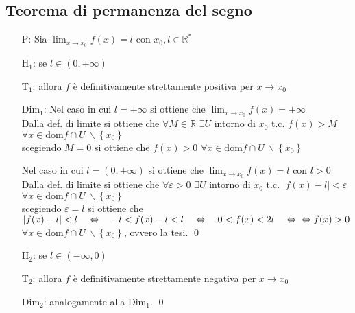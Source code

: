 \documentclass[a4paper]{article}
\newcommand\dom{\text{dom}}
\begin{document}
\subsection{Teorema di permanenza del segno}
\begin{itemize}
	\item[P: ] Sia \(\displaystyle \lim_{x \to x_0} f(x) = l\) con \(x_0, l \in \mathbb{R}^*\)
	\item[H\(_1\): ] se \(l \in \left( 0, + \infty \right)\)
	\item[T\(_1\): ] allora \(f\) è definitivamente strettamente positiva per \(x \to x_0\)
	\item[Dim\(_1\): ] Nel caso in cui \(l = + \infty\) si ottiene che \(\displaystyle \lim_{x \to x_0} f(x) = + \infty\) \\
	Dalla def. di limite si ottiene che \(\forall M \in \mathbb{R}\) \(\exists U\) intorno di \(x_0\) t.c. \(f(x) > M\) \(\forall x \in \dom f \cap U \  \backslash \left\{ x_0 \right\}\) \\
	scegiendo \(M = 0\) si ottiene che \(f(x) > 0\) \(\forall x \in \dom f \cap U \  \backslash \left\{ x_0 \right\}\)
	\item[] Nel caso in cui \(l = \left( 0, + \infty \right)\) si ottiene che \(\displaystyle \lim_{x \to x_0} f(x) = l\) con \(l > 0\) \\
	Dalla def. di limite si ottiene che \(\forall \varepsilon > 0\) \(\exists U\) intorno di \(x_0\) t.c. \(\left| f(x) - l \right| < \varepsilon\) \(\forall x \in \dom f \cap U \  \backslash \left\{ x_0 \right\}\) \\
	scegiendo \(\varepsilon = l\) si ottiene che \(\left| f(x) - l \right| < l \quad \Leftrightarrow \quad -l < f(x) - l < l \quad \Leftrightarrow \quad 0 < f(x) < 2l \quad \Leftrightarrow \\
	\Leftrightarrow f(x) > 0\) \(\forall x \in \dom f \cap U \  \backslash \left\{ x_0 \right\}\), ovvero la tesi. \qed

	\item[H\(_2\): ] se \(l \in \left( - \infty, 0 \right)\)
	\item[T\(_2\): ] allora \(f\) è definitivamente strettamente negativa per \(x \to x_0\)
	\item[Dim\(_2\): ] analogamente alla Dim\(_1\). \qed
\end{itemize}
\end{document}
